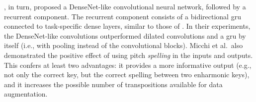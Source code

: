 \textcite{micchi2020not}, in turn, proposed a DenseNet-like
\parencite{huang2017densely} convolutional neural network,
followed by a recurrent component. The recurrent component
consists of a bidirectional \gls{gru} \parencite{cho2014learning}
connected to task-specific dense layers, similar to those of
\textcite{chen2018functional}. In their experiments, the
DenseNet-like convolutions outperformed dilated convolutions
and a \gls{gru} by itself (i.e., with pooling instead of the
convolutional blocks). Micchi et al.~also demonstrated the
positive effect of using pitch \textit{spelling} in the
inputs and outputs. This confers at least two advantages: it
provides a more informative output (e.g., not only the
correct key, but the correct spelling between two enharmonic
keys), and it increases the possible number of
transpositions available for data augmentation.
